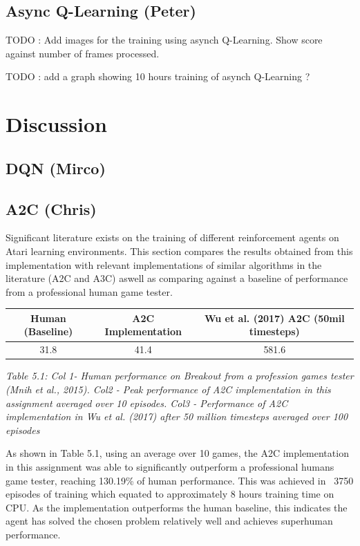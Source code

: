 \documentclass{article}
\begin{document}
\subsection{Async Q-Learning (Peter)}

TODO : Add images for the training using asynch Q-Learning.
Show score against number of frames processed.

TODO : add a graph showing 10 hours training of asynch Q-Learning ?

\section{Discussion}
    

\subsection{DQN (Mirco)}

\subsection{A2C (Chris)}

Significant literature exists on the training of different reinforcement agents on Atari learning environments. This section compares the results obtained from this implementation with relevant implementations of similar algorithms in the literature (A2C and A3C) aswell as comparing against a baseline of performance from a professional human game tester.

\begin{table}[h!]
\centering
\begin{tabular}{|c | c | c |} 
 \hline
 Human (Baseline) & A2C Implementation & Wu et al. (2017) A2C (50mil timesteps) \\ [0.5ex] 
 \hline
 31.8 & 41.4 & 581.6  \\ 
 \hline
\end{tabular}
\end{table}
\emph{Table 5.1: Col 1- Human performance on Breakout from a profession games tester (Mnih et al., 2015). Col2 - Peak performance of A2C implementation in this assignment averaged over 10 episodes. Col3 - Performance of A2C implementation in Wu et al. (2017)  after 50 million timesteps averaged over 100 episodes}

As shown in Table 5.1, using an average over 10 games, the A2C implementation in this assignment was able to significantly outperform a professional humans game tester, reaching 130.19\% of human performance. This was achieved in ~3750 episodes of training which equated to approximately 8 hours training time on CPU. As the implementation outperforms the human baseline, this indicates the agent has solved the chosen problem relatively well and achieves superhuman performance. 
\end{document}
